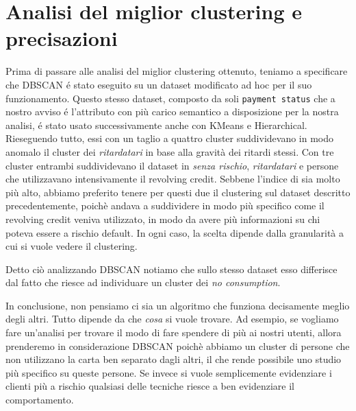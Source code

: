 \section{Analisi del miglior clustering e precisazioni}
Prima di passare alle analisi del miglior clustering ottenuto, teniamo
a specificare che DBSCAN \'e stato eseguito su un dataset modificato
ad hoc per il suo funzionamento. Questo stesso dataset, composto da soli
\texttt{payment status} che a nostro avviso \'e l'attributo con pi\`u
carico semantico a disposizione per la nostra analisi, \'e stato usato
successivamente anche con KMeans e Hierarchical. Rieseguendo tutto, essi
con un taglio a quattro cluster suddividevano in modo anomalo il cluster dei
\textit{ritardatari} in base alla gravit\`a dei ritardi stessi.
Con tre cluster entrambi suddividevano il dataset in \textit{senza rischio},
\textit{ritardatari} e persone che utilizzavano intensivamente il revolving credit.
Sebbene l'indice di \sil sia molto pi\`u alto, abbiamo preferito tenere per questi due
il clustering sul dataset descritto precedentemente, poich\`e andava a suddividere in
modo pi\`u specifico come il revolving credit veniva utilizzato, in modo da avere 
pi\`u informazioni su chi poteva essere a rischio default. In ogni caso,
la scelta dipende dalla granularit\`a a cui si vuole vedere il clustering.

Detto ci\`o analizzando DBSCAN notiamo che sullo stesso dataset esso differisce
dal fatto che riesce ad individuare un cluster dei \textit{no consumption}.

In conclusione, non pensiamo ci sia un algoritmo che funziona decisamente meglio
degli altri. Tutto dipende da che \textit{cosa} si vuole trovare. 
Ad esempio, se vogliamo fare un'analisi per trovare il modo di
fare spendere di pi\`u ai nostri utenti, allora prenderemo in considerazione
DBSCAN poich\`e abbiamo un cluster di persone che non utilizzano la carta ben
separato dagli altri, il che rende possibile uno studio pi\`u specifico su queste
persone. Se invece si vuole semplicemente evidenziare i clienti pi\`u a rischio qualsiasi
delle tecniche riesce a ben evidenziare il comportamento.

